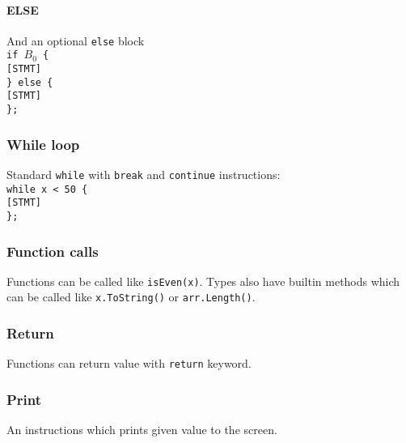 \documentclass{article}
\begin{document}
\paragraph{ELSE}
And an optional \texttt{else} block \\
\texttt{if $B_0$ \{ \\
  \hspace*{2em} [STMT] \\
\} else \{ \\
  \hspace*{2em} [STMT] \\
\};}

\subsubsection{While loop}
Standard \texttt{while} with \texttt{break} and \texttt{continue} instructions: \\
\texttt{while x < 50 \{ \\
  \hspace*{2em} [STMT] \\
\};}

\subsubsection{Function calls}
Functions can be called like \texttt{isEven(x)}. Types also have builtin
methods which can be called like \texttt{x.ToString()} or \texttt{arr.Length()}.

\subsubsection{Return}
Functions can return value with \texttt{return} keyword.

\subsubsection{Print}
An instructions which prints given value to the screen.
\end{document}
